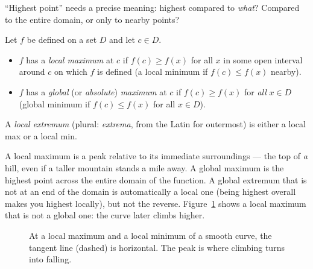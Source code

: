 ``Highest point'' needs a precise meaning: highest compared to \emph{what}?
Compared to the entire domain, or only to nearby points?

\begin{definition}\label{ch16:def-extrema}
Let $f$ be defined on a set $D$ and let $c \in D$.
\begin{itemize}
\item $f$ has a \emph{local maximum} at $c$ if $f(c) \ge f(x)$ for all $x$ in some
open interval around $c$ on which $f$ is defined (a local minimum if
$f(c)\le f(x)$ nearby).
\item $f$ has a \emph{global} (or \emph{absolute}) \emph{maximum} at $c$ if
$f(c)\ge f(x)$ for \emph{all} $x \in D$ (global minimum if $f(c)\le f(x)$ for all
$x\in D$).
\end{itemize}
A \emph{local extremum} (plural: \emph{extrema}, from the Latin for outermost) is either a local max or a local min.
\end{definition}

A local maximum is a peak relative to its immediate surroundings --- the top of
\emph{a} hill, even if a taller mountain stands a mile away. A global maximum is
the highest point across the entire domain of the function. A global extremum
that is not at an end of the domain is automatically a local one (being highest
overall makes you highest locally), but not the reverse.
Figure~\ref{ch16:fig-extrema} shows a local maximum that is not a global one:
the curve later climbs higher.

\begin{figure}[H]
\centering
{}
\caption{At a local maximum and a local minimum of a smooth curve, the tangent
line (dashed) is horizontal. The peak is where climbing turns into falling.}
\label{ch16:fig-extrema}
\end{figure}

